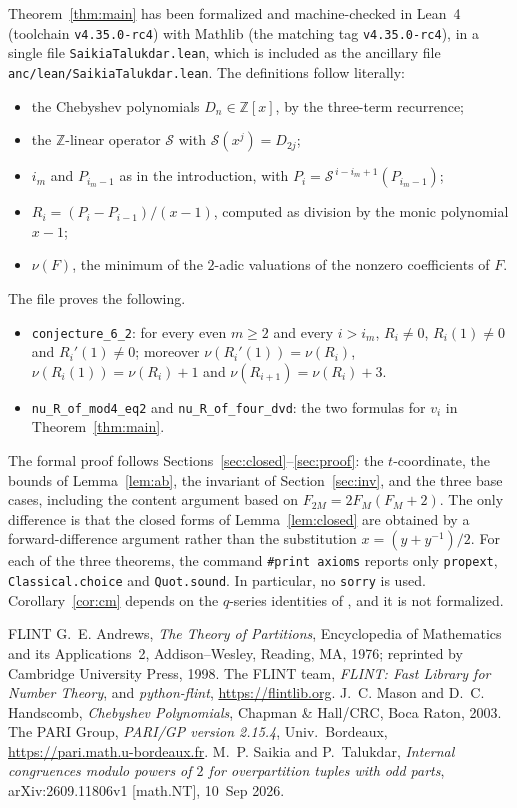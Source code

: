 \documentclass[11pt]{amsart}
\theoremstyle{definition}
\theoremstyle{remark}
\newcommand{\Z}{\mathbb{Z}}
\newcommand{\Sop}{\mathcal{S}}
\begin{document}
Theorem~\ref{thm:main} has been formalized and machine-checked in Lean~4 (toolchain \texttt{v4.35.0-rc4}) with Mathlib (the matching tag \texttt{v4.35.0-rc4}), in a single file \texttt{SaikiaTalukdar.lean}, which is included as the ancillary file \texttt{anc/lean/SaikiaTalukdar.lean}. The definitions follow \cite[\S6]{ST} literally:
\begin{itemize}
\item the Chebyshev polynomials $D_n\in\Z[x]$, by the three-term recurrence;
\item the $\Z$-linear operator $\Sop$ with $\Sop(x^j)=D_{2j}$;
\item $i_m$ and $P_{i_m-1}$ as in the introduction, with $P_i=\Sop^{\,i-i_m+1}(P_{i_m-1})$;
\item $R_i=(P_i-P_{i-1})/(x-1)$, computed as division by the monic polynomial $x-1$;
\item $\nu(F)$, the minimum of the $2$-adic valuations of the nonzero coefficients of $F$.
\end{itemize}
The file proves the following.
\begin{itemize}
\item \texttt{conjecture\_6\_2}: for every even $m\ge2$ and every $i>i_m$, $R_i\ne0$, $R_i(1)\neq0$ and $R_i'(1)\ne0$; moreover $\nu(R_i'(1))=\nu(R_i)$, $\nu(R_i(1))=\nu(R_i)+1$ and $\nu(R_{i+1})=\nu(R_i)+3$.
\item \texttt{nu\_R\_of\_mod4\_eq2} and \texttt{nu\_R\_of\_four\_dvd}: the two formulas for $v_i$ in Theorem~\ref{thm:main}.
\end{itemize}
The formal proof follows Sections~\ref{sec:closed}--\ref{sec:proof}: the $t$-coordinate, the bounds of Lemma~\ref{lem:ab}, the invariant of Section~\ref{sec:inv}, and the three base cases, including the content argument based on $F_{2M}=2F_M(F_M+2)$. The only difference is that the closed forms of Lemma~\ref{lem:closed} are obtained by a forward-difference argument rather than the substitution $x=(y+y^{-1})/2$. For each of the three theorems, the command \texttt{\#print axioms} reports only \texttt{propext}, \texttt{Classical.choice} and \texttt{Quot.sound}. In particular, no \texttt{sorry} is used. Corollary~\ref{cor:cm} depends on the $q$-series identities of \cite{ST}, and it is not formalized.

\begin{thebibliography}{FLINT}
 G.~E. Andrews, \emph{The Theory of Partitions}, Encyclopedia of Mathematics and its Applications~2, Addison--Wesley, Reading, MA, 1976; reprinted by Cambridge University Press, 1998.
 The FLINT team, \emph{FLINT: Fast Library for Number Theory}, and \emph{python-flint}, \url{https://flintlib.org}.
 J.~C. Mason and D.~C. Handscomb, \emph{Chebyshev Polynomials}, Chapman \& Hall/CRC, Boca Raton, 2003.
 The PARI Group, \emph{PARI/GP version 2.15.4}, Univ.\ Bordeaux, \url{https://pari.math.u-bordeaux.fr}.
 M.~P. Saikia and P.~Talukdar, \emph{Internal congruences modulo powers of $2$ for overpartition tuples with odd parts}, arXiv:2609.11806v1 [math.NT], 10~Sep 2026.
\end{thebibliography}
\end{document}
